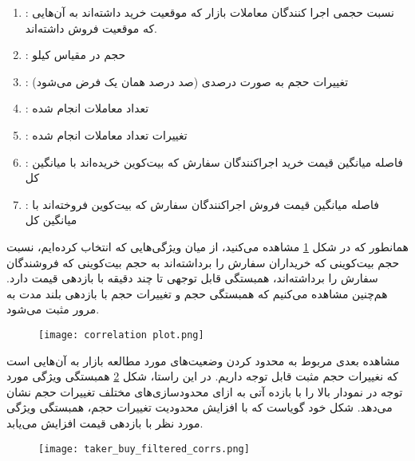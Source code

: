 \documentclass{scribe-cgenomics}
\begin{document}
\begin{enumerate}
\item{
:
نسبت حجمی اجرا کنندگان معاملات بازار که موقعیت خرید داشته‌اند به آن‌هایی که موقعیت فروش داشته‌اند.
}
\item{
:
حجم در مقیاس کیلو
}
\item{
:
تغییرات حجم به صورت درصدی (صد درصد همان یک فرض می‌شود)
}
\item{
:
تعداد معاملات انجام شده
}
\item{
:
تغییرات تعداد معاملات انجام شده
}
\item{
:
فاصله میانگین قیمت خرید اجراکنندگان سفارش که بیت‌کوین خریده‌اند با میانگین کل
}
\item{
:
فاصله میانگین قیمت فروش اجراکنندگان سفارش که بیت‌کوین فروخته‌اند با میانگین کل
}

\end{enumerate}

\begin{مشاهده}
همانطور که در شکل
\ref{corr_plot}
 مشاهده می‌کنید، از میان ویژگی‌هایی که انتخاب کرده‌ایم، نسبت حجم بیت‌کوینی که خریداران سفارش را برداشته‌اند به حجم بیت‌کوینی که فروشندگان سفارش را برداشته‌اند، همبستگی قابل توجهی تا چند دقیقه با بازدهی قیمت دارد. هم‌چنین مشاهده می‌کنیم که همبستگی حجم و تغییرات حجم با بازدهی بلند مدت به مرور مثبت می‌شود.

\begin{figure}\label{corr_plot}
\texttt{[image: correlation plot.png]}
\centering
\end{figure}
\end{مشاهده}

\begin{مشاهده}
مشاهده بعدی مربوط به محدود کردن وضعیت‌های مورد مطالعه بازار به آن‌هایی است که نغییرات حجم مثبت قابل توجه داریم. در این راستا، شکل
\ref{taker_buy_filtered_corrs}
 همبستگی ویژگی مورد توجه در نمودار بالا را با بازده آتی به ازای محدود‌سازی‌های مختلف تغییرات حجم نشان می‌دهد. شکل خود گویاست که با افزایش محدودیت تغییرات حجم، همبستگی ویژگی مورد نظر با بازدهی قیمت افزایش می‌یابد.


\begin{figure}\label{taker_buy_filtered_corrs}
\texttt{[image: taker\_buy\_filtered\_corrs.png]}
\centering
\end{figure}
\end{مشاهده}
\end{document}
